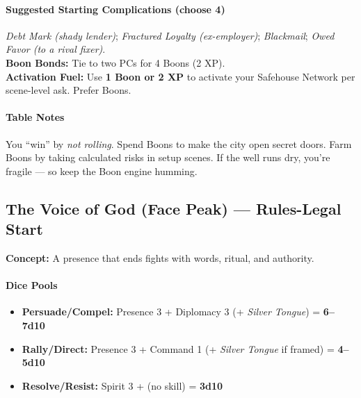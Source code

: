 \documentclass[11pt]{book}
\begin{document}
\paragraph{Suggested Starting Complications (choose 4)}
\emph{Debt Mark (shady lender)}; \emph{Fractured Loyalty (ex-employer)}; \emph{Blackmail}; \emph{Owed Favor (to a rival fixer)}.\\
\textbf{Boon Bonds:} Tie to two PCs for 4 Boons (2 XP).\\
\textbf{Activation Fuel:} Use \textbf{1 Boon or 2 XP} to activate your Safehouse Network per scene-level ask. Prefer Boons.

\paragraph{Table Notes}
You “win” by \emph{not rolling}. Spend Boons to make the city open secret doors. Farm Boons by taking calculated risks in setup scenes. If the well runs dry, you’re fragile — so keep the Boon engine humming.

\bigskip

\subsection*{The Voice of God (Face Peak) — Rules-Legal Start}
\textbf{Concept:} A presence that ends fights with words, ritual, and authority.

\paragraph{Dice Pools}
\begin{itemize}
  \item \textbf{Persuade/Compel:} Presence 3 + Diplomacy 3 (+ \emph{Silver Tongue}) = \textbf{6–7d10}
  \item \textbf{Rally/Direct:} Presence 3 + Command 1 (+ \emph{Silver Tongue} if framed) = \textbf{4–5d10}
  \item \textbf{Resolve/Resist:} Spirit 3 + (no skill) = \textbf{3d10}
\end{itemize}
\end{document}
